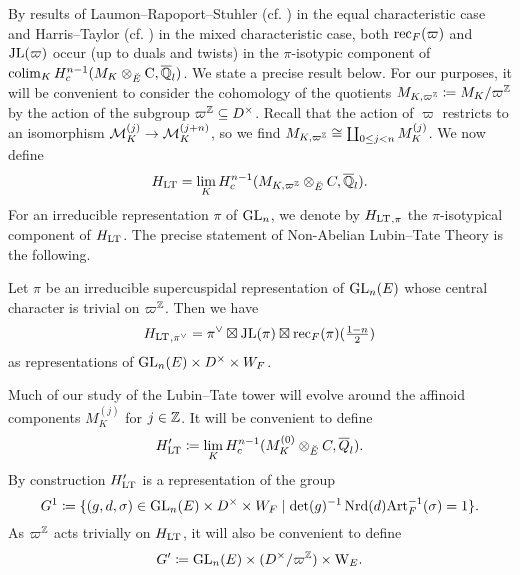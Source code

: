 \documentclass[../main.tex]{subfiles}
\begin{document}
By results of Laumon--Rapoport--Stuhler (cf. \cite{laumon1993elliptic})
in the equal characteristic case and Harris--Taylor (cf. \cite{HTShimura}) in the 
mixed characteristic case, both $\mathrm{rec}_F(\varpi)$ and $\mathrm{JL}(\varpi)$ occur
(up to duals and twists) in the $\pi$-isotypic component of 
$\operatorname*{colim}_K H^{n-1}_c (M_{K} \otimes_{{\breve {E}}} {\mathrm{C}}, \overline {\mathbb{Q}}_l)$. We state a
precise result below.
For our purposes, it will be convenient to consider the cohomology of the 
quotients $M_{K, \varpi^{\mathbb{Z}}} \coloneqq M_K/\varpi^{\mathbb{Z}}$ by the action of the
subgroup $\varpi^{\mathbb{Z}} \subseteq D^\times$. Recall that the action of 
$\varpi$ restricts to an isomorphism $\mathcal{M}_K^{(j)} \to \mathcal{M}_K^{(j+n)}$, so we find
$M_{K, \varpi^{\mathbb{Z}}} \cong \coprod_{0 \leq j < n} M_{K}^{(j)}$. We now define
\begin{equation} \label{eq:defHLT}
  H_{\mathrm{LT}} = \lim_{K} H^{n-1}_c (M_{K, \varpi^{\mathbb{Z}}} \otimes_{{\breve {E}}} C, \overline {\mathbb{Q}}_l).
\end{equation}
For an irreducible representation $\pi$ of $\operatorname{GL}_n$, we denote by ${H_{\mathrm{LT}}}_{,\pi}$ the 
$\pi$-isotypical component of $H_{\mathrm{LT}}$.
The precise statement of Non-Abelian Lubin--Tate Theory is the following.
\begin{thm}\label{thm:NonAbLTT}
  Let $\pi$ be an irreducible supercuspidal representation of $\operatorname{GL}_n(E)$ whose central
  character is trivial on $\varpi^{\mathbb{Z}}$.   
  Then we have 
  \begin{equation*}
    {H_{\mathrm{LT}}}_{,\pi^\vee} = \pi^\vee \boxtimes \mathrm{JL}(\pi) \boxtimes \mathrm{rec}_F(\pi)(\tfrac{1-n}2)
  \end{equation*}
  as representations of $\operatorname{GL}_n(E) \times D^\times \times W_F$. 
\end{thm}

Much of our study of the Lubin--Tate tower will evolve around
the affinoid components $M_{K}^{(j)}$ for $j \in \mathbb{Z}$. It will be convenient to define 
\begin{equation*}
  H_{\mathrm{LT}}' \coloneqq \lim_K H^{n-1}_c(M_{K}^{(0)} \otimes_{{\breve {E}}} C, \overline Q_l).
\end{equation*}
By construction $H_{\mathrm{LT}}'$ is a representation of the group
\begin{equation}\label{eq:DefGandG1}
  G^1 \coloneqq \{(g,d,\sigma) \in \operatorname{GL}_n(E) \times D^\times \times W_F \mid 
  \det(g)^{-1} \operatorname{Nrd}(d) \mathrm{Art}_F^{-1}(\sigma) = 1\}.
\end{equation}
As $\varpi^{\mathbb{Z}}$ acts trivially on $H_{\mathrm{LT}}$, it will also be convenient to define
\begin{equation*}
  G' \coloneqq \operatorname{GL}_n(E) \times (D^\times/\varpi^{\mathbb{Z}}) \times \mathrm W_E.
\end{equation*}
\end{document}
